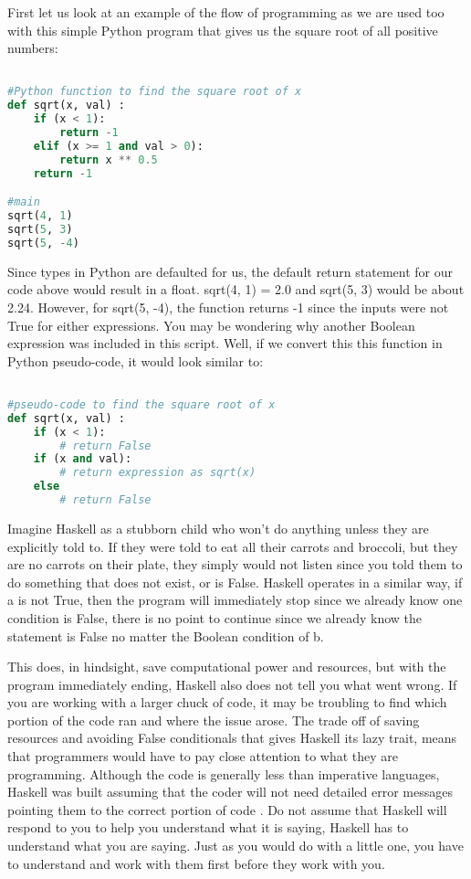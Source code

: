 \documentclass{article}
\begin{document}
\medskip\noindent
First let us look at an example of the flow of programming as we are used too with this simple Python program that gives us the square root of all positive numbers:

\begin{lstlisting}[language=Python]

#Python function to find the square root of x
def sqrt(x, val) :
    if (x < 1):
        return -1
    elif (x >= 1 and val > 0):
        return x ** 0.5
    return -1

#main
sqrt(4, 1)
sqrt(5, 3)
sqrt(5, -4)
\end{lstlisting}
\noindent
Since types in Python are defaulted for us, the default return statement for our code above would result in a float. sqrt(4, 1) = 2.0 and sqrt(5, 3) would be about 2.24. However, for sqrt(5, -4), the function returns -1 since the inputs were not True for either expressions. You may be wondering why another Boolean expression was included in this script. Well, if we convert this this function in Python pseudo-code, it would look similar to:

\begin{lstlisting}[language=Python]

#pseudo-code to find the square root of x
def sqrt(x, val) :
    if (x < 1):
        # return False
    if (x and val):
        # return expression as sqrt(x)
    else
        # return False
\end{lstlisting}
\noindent
Imagine Haskell as a stubborn child who won't do anything unless they are explicitly told to. If they were told to eat all their carrots and broccoli, but they are no carrots on their plate, they simply would not listen since you told them to do something that does not exist, or is False. Haskell operates in a similar way, if a is not True, then the program will immediately stop since we already know one condition is False, there is no point to continue since we already know the statement is False no matter the Boolean condition of b. 

\medskip\noindent
This does, in hindsight, save computational power and resources, but with the program immediately ending, Haskell also does not tell you what went wrong. If you are working with a larger chuck of code, it may be troubling to find which portion of the code ran and where the issue arose. The trade off of saving resources and avoiding False conditionals that gives Haskell its lazy trait, means that programmers would have to pay close attention to what they are programming. Although the code is generally less than imperative languages, Haskell was built assuming that the coder will not need detailed error messages pointing them to the correct portion of code \cite{LYH}. Do not assume that Haskell will respond to you to help you understand what it is saying, Haskell has to understand what you are saying. Just as you would do with a little one, you have to understand and work with them first before they work with you.
\end{document}

